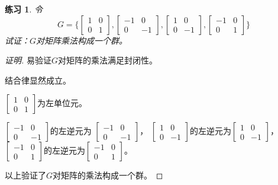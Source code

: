 \documentclass{article}
\newtheorem{Exercise}{练习}
\begin{document}
\begin{CJK*}{UTF8}{gbsn}
\begin{Exercise}
 令
 \[G=\bigg\{\begin{bmatrix}
  1&0\\0&1
 \end{bmatrix},
 \begin{bmatrix}
  -1&0\\0&-1
 \end{bmatrix},
 \begin{bmatrix}
  1&0\\0&-1
 \end{bmatrix},
 \begin{bmatrix}
  -1&0\\0&1
 \end{bmatrix}\bigg\}\] 
 试证：$G$对矩阵乘法构成一个群。
\end{Exercise}

\begin{proof}[证明]
  易验证$G$对矩阵的乘法满足封闭性。

  结合律显然成立。

  $\begin{bmatrix}
    1&0\\0&1
   \end{bmatrix}$为左单位元。

   $\begin{bmatrix}
    -1&0\\0&-1
   \end{bmatrix}$的左逆元为
   $\begin{bmatrix}
    -1&0\\0&-1
   \end{bmatrix}$，
   $\begin{bmatrix}
    1&0\\0&-1
   \end{bmatrix}$的左逆元为$\begin{bmatrix}
    1&0\\0&-1
   \end{bmatrix}$，
   $\begin{bmatrix}
    -1&0\\0&1
   \end{bmatrix}$的左逆元为$\begin{bmatrix}
    -1&0\\0&1
   \end{bmatrix}$。

   以上验证了$G$对矩阵的乘法构成一个群。
  
\end{proof}


\end{CJK*}
\end{document}
